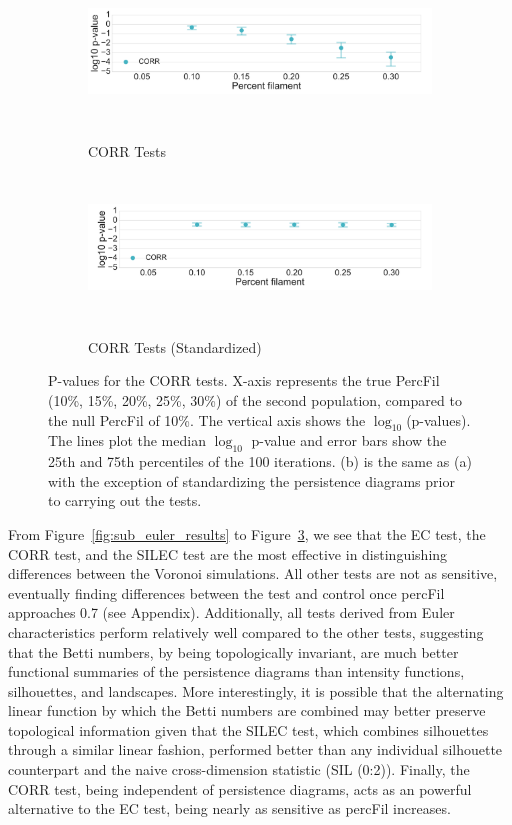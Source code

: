 \documentclass[12pt]{article}
\newcommand{\figref}[1]{Figure~\ref{#1}}
\begin{document}
\begin{figure}[htp!]
  \centering
  \begin{subfigure}{.9\textwidth}
    \caption{CORR Tests}
    \includegraphics[width=\linewidth, height = 1.5in]{figure_8_correlation_group.pdf}
    \label{fig:sub_corr}
  \end{subfigure}
  \begin{subfigure}{.9\textwidth}
    \caption{CORR Tests (Standardized)}
    \includegraphics[width=\linewidth, height = 1.5in]{figure_8_correlation_group_normed.pdf}
    \label{fig:sub_corr_normed}
  \end{subfigure}
\caption{P-values for the CORR tests. X-axis represents the true PercFil (10\%, 15\%, 20\%, 25\%, 30\%) of the second population, compared to the null PercFil of 10\%.
The vertical axis shows the $\log_{10}$(p-values). The lines plot the median $\log_{10}$ p-value and error bars show the 25th and 75th percentiles of the 100 iterations. (b) is the same as (a) with the exception of standardizing the persistence diagrams prior to carrying out the tests. }
\label{fig:sub_corr_results_2}
\end{figure}

From \figref{fig:sub_euler_results} to \figref{fig:sub_corr_results_2}, we see that the EC test, the CORR test, and the SILEC test are the most effective in distinguishing differences between the Voronoi simulations. All other tests are not as sensitive, eventually finding differences between the test and control once percFil approaches 0.7 (see Appendix). Additionally, all tests derived from Euler characteristics perform relatively well compared to the other tests, suggesting that the Betti numbers, by being topologically invariant, are much better functional summaries of the persistence diagrams than intensity functions, silhouettes, and landscapes. More interestingly, it is possible that the alternating linear function by which the Betti numbers are combined may better preserve topological information given that the SILEC test, which combines silhouettes through a similar linear fashion, performed better than any individual silhouette counterpart and the naive cross-dimension statistic (SIL (0:2)). Finally, the CORR test, being independent of persistence diagrams, acts as an powerful alternative to the EC test, being nearly as sensitive as percFil increases.
\end{document}
